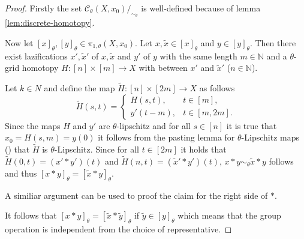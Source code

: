 \documentclass[a4paper, 11pt, twoside]{article}
\newcommand{\N}[0]{\mathbb{N}}
\theoremstyle{break}
\theoremstyle{break}
\begin{document}
\begin{proof}
  Firstly the set $\mathcal{C}_{\theta}(X, x_0)/_{\sim_{\theta}}$ is well-defined because of lemma \ref{lem:discrete-homotopy}.

  Now let $[x]_{\theta}, [y]_{\theta} \in \pi_{1, \theta}(X, x_0)$. Let $x, \tilde{x} \in [x]_{\theta}$ and $y \in [y]_{\theta}$.
  Then there exist lazifications $x', \tilde{x}'$ of $x, \tilde{x}$ and $y'$ of $y$ with the same length $m \in \N$ 
  and a $\theta$-grid homotopy $H\colon [n] \times [m] \to X$ with between $x'$ and $\tilde{x}'$ ($n \in \N$).

  Let $k \in N$ and define the map $\tilde{H}\colon [n] \times [2m] \to X$ as follows
  \begin{equation*}
    \tilde{H}(s, t) = \begin{cases}
       H(s, t), &t \in [m], \\
       y'(t-m), &t \in [m,2m].
    \end{cases}
  \end{equation*}
  Since the maps $H$ and $y'$ are $\theta$-lipschitz and for all $s \in [n]$ it is true that $x_0 = H(s,m) = y(0)$ 
  it follows from the pasting lemma for $\theta$-Lipschitz maps (\cite[Thm. 1]{kvalheim2021pasting}) that $\tilde{H}$ is $\theta$-Lipschitz.
  Since for all $t \in [2m]$ it holds that $\tilde{H}(0, t) = (x' * y')(t)$ and $\tilde{H}(n, t) = (\tilde{x}' * y')(t)$,
  $x * y \sim_{\theta} \tilde{x} * y$ follows and thus $[x * y]_{\theta} = [\tilde{x} * y]_\theta$.

  A similiar argument can be used to proof the claim for the right side of $*$. 
  
  It follows that $[x * y]_{\theta} = [\tilde{x} * \tilde{y}]_{\theta}$ if $\tilde{y} \in [y]_\theta$ 
  which means that the group operation is independent from the choice of representative.


\end{proof}
\end{document}
